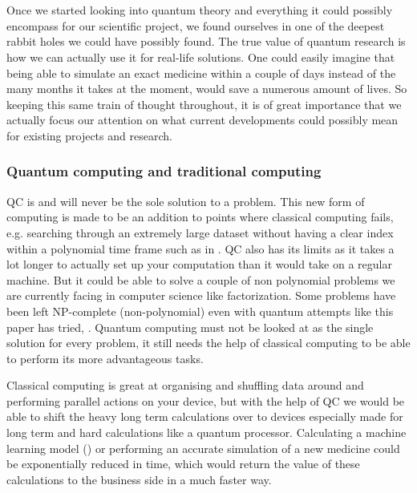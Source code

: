 
\chapter{}
\label{ch:computing-with-quantum}

Once we started looking into quantum theory and everything it could possibly encompass for our scientific project, we found ourselves in one of the deepest rabbit holes we could have possibly found. The true value of quantum research is how we can actually use it for real-life solutions. One could easily imagine that being able to simulate an exact medicine within a couple of days instead of the many months it takes at the moment, would save a numerous amount of lives. So keeping this same train of thought throughout, it is of great importance that we actually focus our attention on what current developments could possibly mean for existing projects and research.

\subsection{Quantum computing and traditional computing}

QC is and will never be the sole solution to a problem. This new form of computing is made to be an addition to points where classical computing fails, e.g. searching through an extremely large dataset without having a clear index within a polynomial time frame such as in \textcite{Terhal1998}. QC also has its limits as it takes a lot longer to actually set up your computation than it would take on a regular machine. But it could be able to solve a couple of non polynomial problems we are currently facing in computer science like factorization. 
Some problems have been left NP-complete (non-polynomial) even with quantum attempts like this paper has tried, \textcite{Wang2007}. Quantum computing must not be looked at as the single solution for every problem, it still needs the help of classical computing to be able to perform its more advantageous tasks. 

Classical computing is great at organising and shuffling data around and performing parallel actions on your device, but with the help of QC we would be able to shift the heavy long term calculations over to devices especially made for long term and hard calculations like a quantum processor. Calculating a machine learning model (\textcite{Schuld2014}) or performing an accurate simulation of a new medicine could be exponentially reduced in time, which would return the value of these calculations to the business side in a much faster way. \autocite{Schuld2015} \autocite{Troyer2005}

